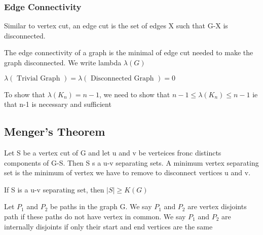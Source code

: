 \documentclass{article}
\begin{document}
\subsubsection{Edge Connectivity}

\begin{definition}
    Similar to vertex cut, an edge cut is the set of edges X such that G-X is
    disconnected.
\end{definition}

\begin{definition}
    The edge connectivity of a graph is the minimal of edge cut needed to make
    the graph disconnected. We write lambda $\lambda(G)$
\end{definition}

\begin{remark}
    $\lambda(\text{ Trivial Graph }) = \lambda(\text{ Disconnected Graph }) = 0$
\end{remark}

\begin{theorem}[Edge Connectivity of a complete graph is $\lambda(K_n)=n-1$]
    To show that $\lambda(K_n)=n-1$, we need to show that $ n-1 \leq
    \lambda(K_n) \leq n-1$ ie that n-1 is necessary and sufficient
\end{theorem}

\subsection{Menger's Theorem}%
\label{sub:Menger's Theorem}

\begin{definition}
    Let S be a vertex cut of G and let u and v be verteices fronc distincts
    components of G-S. Then S s a u-v separating sets. A minimum
    vertex separating set is the minimum of vertex we have to remove to
    disconnect vertices u and v.
\end{definition}

\begin{remark}
\end{remark}

\begin{proposition}
    If S is a u-v separating set, then $|S| \geq K(G)$
\end{proposition}

\begin{definition}
    Let $P_1$ and $P_2$ be paths in the graph G. We say $P_1$ and $P_2$
    are vertex disjoints path if these paths do not have vertex in common.
    We say $P_1$ and $P_2$ are internally disjoints if only their start
    and end vertices are the same
\end{definition}
\end{document}
